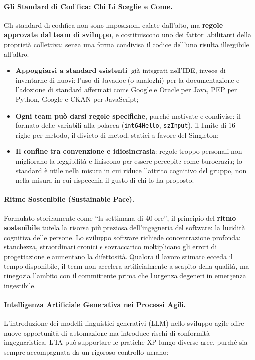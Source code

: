 \documentclass[12pt]{extarticle}
\begin{document}
\paragraph{Gli Standard di Codifica: Chi Li Sceglie e Come.}
Gli standard di codifica non sono imposizioni calate dall'alto, ma \textbf{regole approvate dal team di sviluppo}, e costituiscono uno dei fattori abilitanti della proprietà collettiva: senza una forma condivisa il codice dell'uno risulta illeggibile all'altro.
\begin{itemize}
    \item \textbf{Appoggiarsi a standard esistenti}, già integrati nell'IDE, invece di inventarne di nuovi: l'uso di Javadoc (o analoghi) per la documentazione e l'adozione di standard affermati come Google e Oracle per Java, PEP per Python, Google e CKAN per JavaScript;
    \item \textbf{Ogni team può darsi regole specifiche}, purché motivate e condivise: il formato delle variabili alla polacca (\texttt{int64Hello}, \texttt{szInput}), il limite di 16 righe per metodo, il divieto di metodi statici a favore del Singleton;
    \item \textbf{Il confine tra convenzione e idiosincrasia}: regole troppo personali non migliorano la leggibilità e finiscono per essere percepite come burocrazia; lo standard è utile nella misura in cui riduce l'attrito cognitivo del gruppo, non nella misura in cui rispecchia il gusto di chi lo ha proposto.
\end{itemize}

\paragraph{Ritmo Sostenibile (Sustainable Pace).}
Formulato storicamente come ``la settimana di 40 ore'', il principio del \textbf{ritmo sostenibile} tutela la risorsa più preziosa dell'ingegneria del software: la lucidità cognitiva delle persone. Lo sviluppo software richiede concentrazione profonda; stanchezza, straordinari cronici e sovraccarico moltiplicano gli errori di progettazione e aumentano la difettosità. Qualora il lavoro stimato ecceda il tempo disponibile, il team non accelera artificialmente a scapito della qualità, ma rinegozia l'ambito con il committente prima che l'urgenza degeneri in emergenza ingestibile.

\paragraph{Intelligenza Artificiale Generativa nei Processi Agili.}
L'introduzione dei modelli linguistici generativi (LLM) nello sviluppo agile offre nuove opportunità di automazione ma introduce rischi di conformità ingegneristica. L'IA può supportare le pratiche XP lungo diverse aree, purché sia sempre accompagnata da un rigoroso controllo umano:
\end{document}
